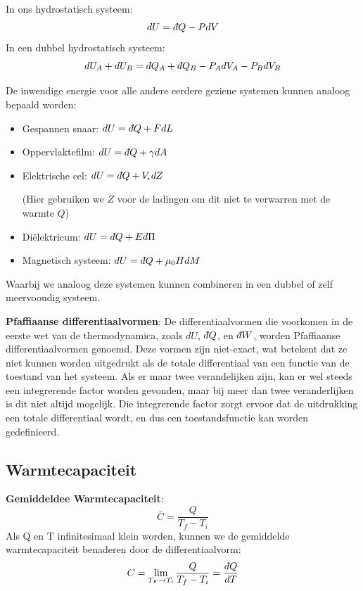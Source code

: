 In ons hydrostatisch systeem:
\[
dU = \dbar Q - PdV
\]
In een dubbel hydrostatisch systeem:
\[
dU_A + dU_B = \dbar Q_A + \dbar Q_B - P_A dV_A - P_B dV_B
\]

De inwendige energie voor alle andere eerdere geziene systemen kunnen analoog bepaald worden:
\begin{itemize}
    \item Gespannen snaar: \(dU = \dbar Q + FdL\)
    \item Oppervlaktefilm: \(dU = \dbar Q + \gamma dA\)
    \item Elektrische cel: \(dU = \dbar Q + V_\epsilon dZ\)

    (Hier gebruiken we \(Z\) voor de ladingen om dit niet te verwarren met de warmte \(Q\))
    \item Diëlektricum: \(dU = \dbar Q + E d\Pi\)
    \item Magnetisch systeem: \(dU = \dbar Q + \mu_0 H dM\)
\end{itemize}

Waarbij we analoog deze systemen kunnen combineren in een dubbel of zelf meervooudig systeem.

\begin{definition}
    \textbf{Pfaffiaanse differentiaalvormen}: De differentiaalvormen die voorkomen in de eerste wet van de thermodynamica, zoals \(dU\), \(\dbar Q\), en \(\dbar W\), worden Pfaffiaanse differentiaalvormen genoemd.
    Deze vormen zijn niet-exact, wat betekent dat ze niet kunnen worden uitgedrukt als de totale differentiaal van een functie van de toestand van het systeem.
    Als er maar twee verandelijken zijn, kan er wel steeds een integrerende factor worden gevonden, maar bij meer dan twee veranderlijken is dit niet altijd mogelijk.
    Die integrerende factor zorgt ervoor dat de uitdrukking een totale differentiaal wordt, en dus een toestandsfunctie kan worden gedefinieerd.
\end{definition}


\subsection{Warmtecapaciteit}

\begin{definition}
    \textbf{Gemiddeldee Warmtecapaciteit}:
    \[\bar{C} = \frac{Q}{T_f-T_i}\]
    Als Q en T infinitesimaal klein worden, kunnen we de gemiddelde warmtecapaciteit benaderen door de differentiaalvorm:
    \[C = \lim_{T_F \to T_i} \frac{Q}{T_f - T_i} =\frac{\dbar Q}{dT}\]
\end{definition}

